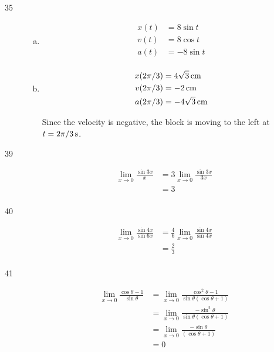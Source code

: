 \documentclass[letterpaper, landscape]{exam}
\begin{document}
\begin{description}
    \item[35] 
      \begin{enumerate}[(a)]
        \item 
          \begin{align*}
            x(t) & = 8 \sin t \\
            v(t) & = 8 \cos t \\
            a(t) & = - 8 \sin t \\
          \end{align*}

        \item 
          \begin{align*}
            x(2 \pi/3) & = \unit[4 \sqrt{3}]{cm} \\
            v(2 \pi/3) & = \unit[-2]{cm} \\
            a(2 \pi/3) & = \unit[- 4 \sqrt{3}]{cm} \\
          \end{align*}

          Since the velocity is negative, the block is moving to the left at 
          $t = \unit[2 \pi/3]{s}$.

      \end{enumerate}

    \item[39] 
      \begin{align*}
        \lim_{x \to 0} \frac{\sin 3x}{x} & = 3 \lim_{x \to 0} \frac{\sin 3x}{3x} \\
                                         & = \boxed{ 3 } \\
      \end{align*}

    \item[40] 
      \begin{align*}
        \lim_{x \to 0} \frac{\sin 4x}{\sin 6x} & = \frac{4}{6} \lim_{x \to 0} \frac{\sin 4x}{\sin 4x} \\
                                               & = \boxed{ \frac{2}{3} } \\
      \end{align*}

    \item[41] 
      \begin{align*}
        \lim_{x \to 0} \frac{\cos \theta - 1}{\sin \theta} 
          & = \lim_{x \to 0} \frac{\cos^2 \theta - 1}{\sin \theta (\cos \theta + 1)} \\
          & = \lim_{x \to 0} \frac{- \sin^2 \theta}{\sin \theta (\cos \theta + 1)} \\
          & = \lim_{x \to 0} \frac{- \sin \theta}{(\cos \theta + 1)} \\
          & = \boxed{ 0 } \\
      \end{align*}


\end{description}
\end{document}
